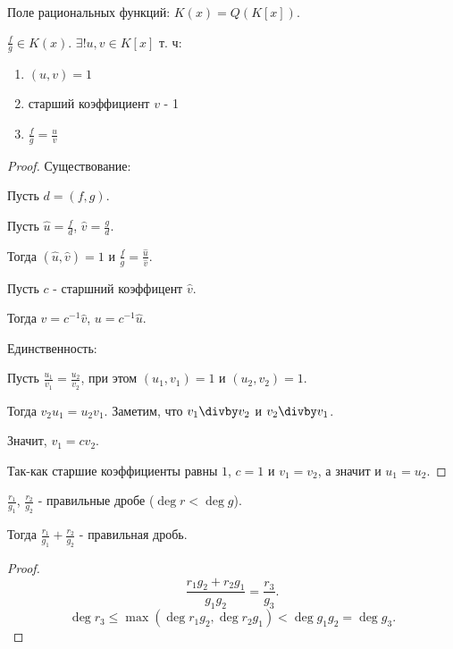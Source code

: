 \begin{definition} \thmslashn 

    Поле рациональных функций: $K(x) = Q(K[x])$.
\end{definition}
\begin{statement} \thmslashn

    $\frac{f}{g}\in K(x)$. $\exists!{u,v\in K[x]}$ т. ч:
    \begin{enumerate}
        \item $(u, v) = 1$
        \item  старший коэффициент $v$ - 1
        \item $\frac{f}{g} = \frac{u}{v}$
    \end{enumerate}
    \begin{proof}
        Существование:

        Пусть $d = (f,g)$. 

        Пусть $\hat{u} = \frac{f}{d}$, $\hat{v} = \frac{g}{d}$.

        Тогда $(\hat{u}, \hat{v}) = 1$ и $\frac{f}{g} = \frac{\hat{u}}{\hat{v}}$.

        Пусть $c$ - старшний коэффицент $\hat{v}$.

        Тогда $v = c^{-1}\hat{v}$, $u = c^{-1}\hat{u}$.

        Единственность:
        
        Пусть $\frac{u_1}{v_1} = \frac{u_2}{v_2}$, при этом $(u_1, v_1) = 1$ и $(u_2, v_2) = 1$.

        Тогда $v_2u_1 = u_2v_1$. Заметим, что $v_1\divby v_2$ и $v_2\divby v_1$.

        Значит, $v_1 = cv_2$. 

        Так-как старшие коэффициенты равны $1$, $c = 1$ и $v_1=v_2$, а значит и $u_1=u_2$.
    \end{proof}
\end{statement}
\begin{lemma} \thmslashn

    $\frac{r_1}{g_1}$, $\frac{r_2}{g_2}$ - правильные дробе ($\deg r < \deg g$).

    Тогда $\frac{r_1}{g_1} + \frac{r_2}{g_2}$ - правильная дробь.
    \begin{proof}
        \[\frac{r_1g_2 + r_2g_1}{g_1g_2} = \frac{r_3}{g_3}.\]
        \[ \deg r_3 \le \max(\deg r_1g_2, \deg r_2g_1) < \deg g_1g_2 = \deg g_3 .\] 
    \end{proof}
\end{lemma}
